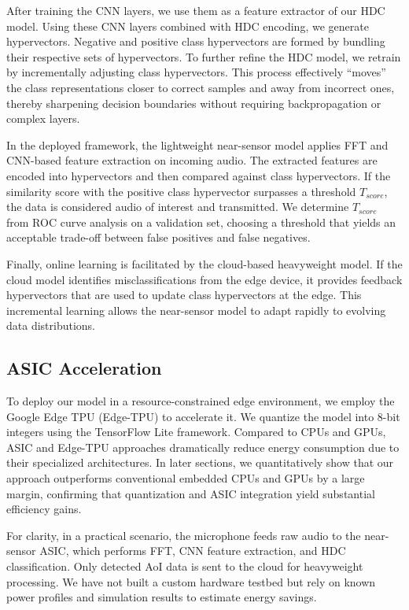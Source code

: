 After training the CNN layers, we use them as a feature extractor of our HDC model. Using these CNN layers combined with HDC encoding, we generate hypervectors. Negative and positive class hypervectors are formed by bundling their respective sets of hypervectors. To further refine the HDC model, we retrain by incrementally adjusting class hypervectors. This process effectively ``moves'' the class representations closer to correct samples and away from incorrect ones, thereby sharpening decision boundaries without requiring backpropagation or complex layers.

In the deployed framework, the lightweight near-sensor model applies FFT and CNN-based feature extraction on incoming audio. The extracted features are encoded into hypervectors and then compared against class hypervectors. If the similarity score with the positive class hypervector surpasses a threshold $T_{score}$, the data is considered audio of interest and transmitted. We determine $T_{score}$ from ROC curve analysis on a validation set, choosing a threshold that yields an acceptable trade-off between false positives and false negatives.

Finally, online learning is facilitated by the cloud-based heavyweight model. If the cloud model identifies misclassifications from the edge device, it provides feedback hypervectors that are used to update class hypervectors at the edge. This incremental learning allows the near-sensor model to adapt rapidly to evolving data distributions.


\subsection{ASIC Acceleration}
To deploy our model in a resource-constrained edge environment, we employ the Google Edge TPU (Edge-TPU) to accelerate it. We quantize the model into 8-bit integers using the TensorFlow Lite framework. Compared to CPUs and GPUs, ASIC and Edge-TPU approaches dramatically reduce energy consumption due to their specialized architectures. In later sections, we quantitatively show that our approach outperforms conventional embedded CPUs and GPUs by a large margin, confirming that quantization and ASIC integration yield substantial efficiency gains.

For clarity, in a practical scenario, the microphone feeds raw audio to the near-sensor ASIC, which performs FFT, CNN feature extraction, and HDC classification. Only detected AoI data is sent to the cloud for heavyweight processing. We have not built a custom hardware testbed but rely on known power profiles and simulation results to estimate energy savings.